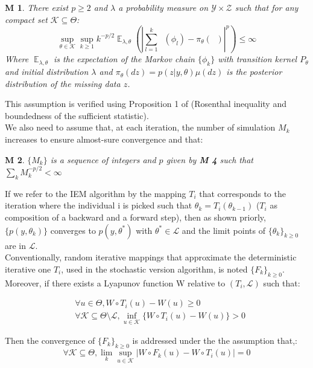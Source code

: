 \documentclass{article}
\theoremstyle{plain}
\newtheorem{assumption}{M}
\DeclareMathOperator*{\E}{\mathbb{E}}
\DeclareMathOperator*{\St}{\tilde{S}}
\theoremstyle{plain}
\theoremstyle{definition}
\begin{document}
\begin{assumption}
There exist $p \geq 2$ and $\lambda$ a probability measure on $\mathcal{Y} \times \mathcal{Z}$ such that for any compact set $\mathcal{K} \subseteq \Theta$:
\begin{equation}
\sup \limits_{\theta \in \mathcal{K}} \sup \limits_{k \geq 1} k^{-p/2}\E_{\lambda,\theta}(|\sum_{l=1}^{k}{\St(\phi_l) - \pi_{\theta}(\St)}|^p) \leq \infty
\end{equation}
Where $\E_{\lambda,\theta}$ is the expectation of the Markov chain $\{\phi_k\}$ with transition kernel $P_\theta$ and initial distribution $\lambda$ and $\pi_{\theta}(dz) = p(z|y,\theta)\mu(dz)$ is the posterior distribution of the missing data $z$.
\end{assumption}
This assumption is verified using Proposition 1 of \citep{fort} (Rosenthal inequality and boundedness of the sufficient statistic).\\
We also need to assume that, at each iteration, the number of simulation $M_k$ increases to ensure almost-sure convergence and that:
\begin{assumption}
$\{M_{k}\}$ is a sequence of integers and $p$ given by {\normalfont \textbf{M 4}} such that $\sum_{k}{M_{k}^{-p/2}}< \infty$
\end{assumption}
If we refer to the IEM algorithm by the mapping $T_{i}$ that corresponds to the iteration where the individual i is picked such that $\theta_{k} = T_{i}(\theta_{k-1})$ ($T_i$ as composition of a backward and a forward step), then as shown priorly, $\{p(y,\theta_{k})\}$ converges to $p(y,\theta^*)$ with $\theta^* \in \mathcal{L}$ and the limit points of $\{\theta_{k}\}_{k \geq 0}$ are in $\mathcal{L}$.\\
Conventionally, random iterative mappings that approximate the deterministic iterative one $T_i$, used in the stochastic version algorithm, is noted $\{F_{k}\}_{k \geq 0}$. Moreover, if there exists a Lyapunov function W relative to $(T_{i},\mathcal{L})$ such that:

\begin{equation}
\begin{split}
&\forall u \in \Theta, W \circ T_i(u) - W(u) \geq 0\\
&\forall \mathcal{K} \subseteq \Theta \setminus \mathcal{L}, \inf\limits_{u \in \mathcal{K}}\{W \circ T_i(u) - W(u)\} > 0
\end{split}
\end{equation}

Then the convergence of $\{F_{k}\}_{k \geq 0}$ is addressed under the the assumption that,:
\begin{equation}
\forall \mathcal{K} \subseteq \Theta, \lim\limits_{k}\sup\limits_{u \in \mathcal{K}} |W \circ F_{k}(u) - W \circ T_i(u)| = 0
\end{equation}
\end{document}
